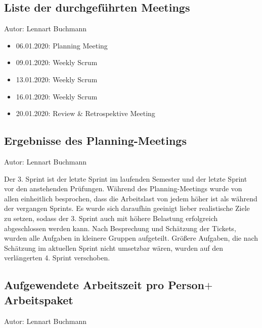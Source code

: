 \subsection{Liste der durchgeführten Meetings}
{\small Autor: Lennart Buchmann}

\begin{itemize}
  \item 06.01.2020: Planning Meeting
  \item 09.01.2020: Weekly Scrum
  \item 13.01.2020: Weekly Scrum
  \item 16.01.2020: Weekly Scrum
  \item 20.01.2020: Review \&  Retrospektive Meeting
\end{itemize}


\subsection{Ergebnisse des Planning-Meetings}
{\small Autor: Lennart Buchmann}

Der 3. Sprint ist der letzte Sprint im laufenden Semester und der letzte Sprint vor den anstehenden Prüfungen. Während des Planning-Meetings wurde von allen einheitlich besprochen, dass die
Arbeitslast von jedem höher ist als während der vergangen Sprints. Es wurde sich daraufhin geeinigt lieber realistische Ziele zu setzen, sodass der 3. Sprint auch mit höhere Belastung erfolgreich 
abgeschlossen werden kann. Nach Besprechung und Schätzung der Tickets, wurden alle Aufgaben in kleinere Gruppen aufgeteilt. Größere Aufgaben, die nach Schätzung im aktuellen Sprint nicht umsetzbar wären, wurden auf den verlängerten 4. Sprint verschoben. 


\subsection{Aufgewendete Arbeitszeit pro Person$+$Arbeitspaket}
{\small Autor: Lennart Buchmann}

